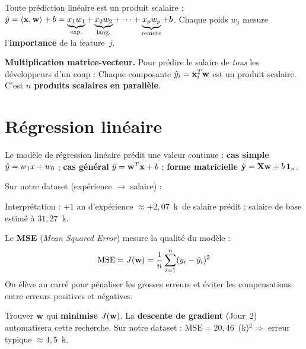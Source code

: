 \begin{intuitionbox}
    Toute pr\'{e}diction lin\'{e}aire est un produit scalaire :
    $\hat{y} = \langle \mathbf{x}, \mathbf{w} \rangle + b
    = \underbrace{x_1 w_1}_{\text{exp.}} + \underbrace{x_2 w_2}_{\text{lang.}}
    + \cdots + \underbrace{x_p w_p}_{\text{remote}} + b$.
    Chaque poids $w_j$ mesure l'\textbf{importance} de la feature~$j$.
\end{intuitionbox}

\textbf{Multiplication matrice-vecteur.}
Pour pr\'{e}dire le salaire de \emph{tous} les d\'{e}veloppeurs d'un coup :
Chaque composante $\hat{y}_i = \mathbf{x}_i^T \mathbf{w}$ est un produit scalaire.
C'est \textbf{$n$ produits scalaires en parall\`{e}le}.

\section{R\'{e}gression lin\'{e}aire}

Le mod\`{e}le de r\'{e}gression lin\'{e}aire pr\'{e}dit une valeur continue :
\textbf{cas simple} $\hat{y} = w_1 x + w_0$ ;
\textbf{cas g\'{e}n\'{e}ral} $\hat{y} = \mathbf{w}^T \mathbf{x} + b$ ;
\textbf{forme matricielle} $\hat{\mathbf{y}} = \mathbf{X} \mathbf{w} + b\,\mathbf{1}_n$.

Sur notre dataset (exp\'{e}rience $\to$ salaire) :

Interpr\'{e}tation : $+1$ an d'exp\'{e}rience $\approx +2{,}07$~k\texteuro\ de salaire
pr\'{e}dit ; salaire de base estim\'{e} \`{a} $31{,}27$~k\texteuro.

\begin{definitionbox}
    Le \textbf{MSE} (\emph{Mean Squared Error}) mesure la qualit\'{e} du mod\`{e}le :
    \begin{equation}
        \text{MSE} = J(\mathbf{w}) = \frac{1}{n} \sum_{i=1}^{n} (y_i - \hat{y}_i)^2
        \label{eq:mse}
    \end{equation}
    On \'{e}l\`{e}ve au carr\'{e} pour p\'{e}naliser les grosses erreurs et \'{e}viter les
    compensations entre erreurs positives et n\'{e}gatives.
\end{definitionbox}

\begin{retenirbox}
    Trouver $\mathbf{w}$ qui \textbf{minimise} $J(\mathbf{w})$. La \textbf{descente de gradient}
    (Jour~2) automatisera cette recherche.
    Sur notre dataset : $\text{MSE} = 20{,}46$~(k\texteuro)$^2 \Rightarrow$
    erreur typique $\approx 4{,}5$~k\texteuro.
\end{retenirbox}

